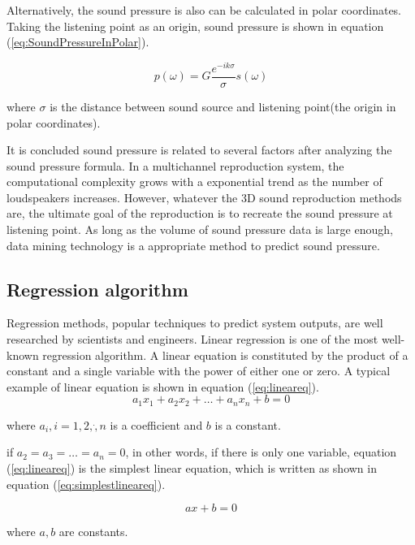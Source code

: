 \documentclass[runningheads,a4paper]{llncs}
\begin{document}
Alternatively, the sound pressure is also can be calculated in polar coordinates. Taking the listening point as an origin, sound pressure is shown in equation (\ref{eq:SoundPressureInPolar}).

\begin{equation}\label{eq:SoundPressureInPolar}
p(\omega)=G\frac{e^{-ik\sigma}}{\sigma}s(\omega)
\end{equation}

where $\sigma$ is the distance between sound source and listening point(the origin in polar coordinates).

It is concluded sound pressure is related to several factors after analyzing the sound pressure formula. In a multichannel reproduction system, the computational complexity grows with a exponential trend as the number of loudspeakers increases. However, whatever the 3D sound reproduction methods are, the ultimate goal of the reproduction is to recreate the sound pressure at listening point. As long as the volume of sound pressure data is large enough, data mining technology is a appropriate method to predict sound pressure.


\subsection{Regression algorithm}
Regression methods, popular techniques to predict system outputs, are well researched by scientists and engineers. Linear regression is one of the most well-known regression algorithm\cite{Hahne14Linear}\cite{Peter15The}. A linear equation is constituted by the product of a constant and  a single variable with the power of either one or zero. A typical example of linear equation is shown in equation (\ref{eq:lineareq}).
\begin{equation}\label{eq:lineareq}
    a_1x_1+a_2x_2+\dots+a_nx_n+b=0
\end{equation}

where $ a_i,i=1,2,\dot,n $ is a coefficient and $b$ is a constant.

if $a_2=a_3=\dots=a_n=0$, in other words, if there is only one variable, equation (\ref{eq:lineareq}) is the simplest linear equation, which is written as shown in equation (\ref{eq:simplestlineareq}).

\begin{equation}\label{eq:simplestlineareq}
    ax+b=0
\end{equation}

where $ a, b$ are constants.
\end{document}
